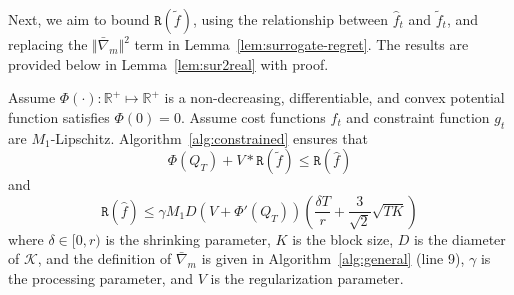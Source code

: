 \documentclass[twoside,11pt,]{article}
\newcommand{\C}[1]{\mathcal{#1}}
\newcommand{\BB}[1]{\mathbb{#1}}
\newcommand{\K}{\C{K}}
\newcommand{\tf}{\tilde{f}}
\newcommand{\tft}{\tilde{f}_t}
\newcommand{\hf}{\hat{f}}
\newcommand{\hft}{\hat{f}_t}
\newcommand{\bn}{\bar{\nabla}}
\begin{document}
Next, we aim to bound $\mathtt{R}(\tf)$, using the relationship between $\hft$ and $\tft$, and replacing the $\Vert \bn_m \Vert ^2$ term in Lemma~\ref{lem:surrogate-regret}. The results are provided below in Lemma~\ref{lem:sur2real} with proof.
\begin{lemma}
\label{lem:sur2real}
    Assume $\Phi(\cdot):\BB{R}^+\mapsto\BB{R}^+$ is a non-decreasing, differentiable, and convex potential function satisfies $\Phi(0)=0$. Assume cost functions $f_t$ and constraint function $g_t$ are $M_1$-Lipschitz.
    Algorithm~\ref{alg:constrained} ensures that
    \begin{equation}
    \label{eq:sur2real:1}
        \Phi (Q_T) + V * \mathtt{R}(\tf) \leq \mathtt{R} (\hf)
    \end{equation}
    and
    \begin{equation}
    \label{eq:sur2real:2}
        \mathtt{R} (\hat{f}) \leq \gamma M_1 D (V+\Phi'(Q_T))
        (\frac{\delta T}{r} + \frac{3}{\sqrt{2}}\sqrt{TK})
    \end{equation}
    where $\delta \in [0,r)$ is the shrinking parameter, $K$ is the block size, $D$ is the diameter of $\K$, and the definition of $\bn_m$ is given in Algorithm~\ref{alg:general} (line 9), $\gamma$ is the processing parameter, and $V$ is the regularization parameter.
\end{lemma}
\end{document}
